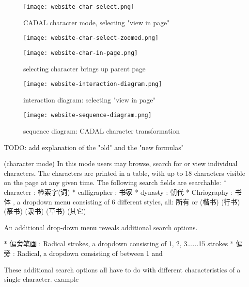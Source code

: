             
    \begin{figure}{}
    \parbox{12cm}{\texttt{[image: website-char-select.png]}}
    \caption{CADAL character mode, selecting "view in page"}
    \label{Character table in CADAL}
    \end{figure}
    
    \begin{figure}[t]
    \parbox{3cm}{\texttt{[image: website-char-select-zoomed.png]}}
    \qquad
    \parbox{10cm}{\texttt{[image: website-char-in-page.png]}}
    \caption{selecting character brings up parent page}
    \label{selecting character brings up parent page}
    \end{figure}
    
    \begin{figure}[t]
    \parbox{12cm}{\texttt{[image: website-interaction-diagram.png]}}
    \caption{interaction diagram: selecting "view in page"}
    \label{CADAL website interaction diagram}
    \end{figure}
    
    \begin{figure}[t]
    \parbox{12cm}{\texttt{[image: website-sequence-diagram.png]}}
    \caption{sequence diagram: CADAL character transformation }
    \label{CADAL website sequence diagram}
    \end{figure}
    
    
    
    TODO: add explanation of the "old" and the "new formulas"
    
    (character mode)
        In this mode users may browse, search for or view individual characters.  The characters are printed in a table, with up to 18 characters visible on the page at any given time.  The following search fields are searchable:
            * character : 检索字(词)
            * calligrapher :  书家
            * dynasty :  朝代
            * Chriography :  书体 , a dropdown menu consisting of 6 different styles, all: 所有 or (楷书) (行书) (篆书) (隶书) (草书) (其它)
            
            An additional drop-down menu reveals additional search options.
            
            * 偏旁笔画 : Radical strokes, a dropdown consisting of 1, 2, 3......15 strokes
            *  偏旁 : Radical, a dropdown consisting of between 1 and 
            
            
            These additional search options all have to do with different characteristics of a single character.  example


